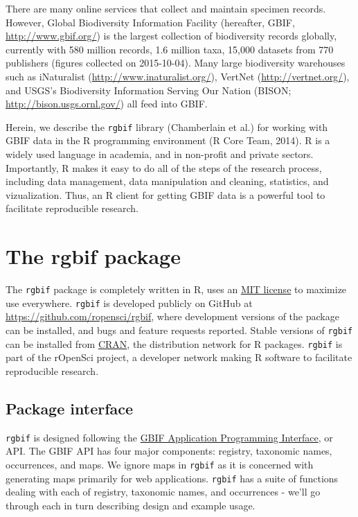 \documentclass[author-year, review, 11pt]{components/elsarticle} %
\begin{document}
There are many online services that collect and maintain specimen
records. However, Global Biodiversity Information Facility (hereafter,
GBIF, \url{http://www.gbif.org/}) is the largest collection of
biodiversity records globally, currently with 580 million records, 1.6
million taxa, 15,000 datasets from 770 publishers (figures collected on
2015-10-04). Many large biodiversity warehouses such as iNaturalist
(\url{http://www.inaturalist.org/}), VertNet
(\url{http://vertnet.org/}), and USGS's Biodiversity Information Serving
Our Nation (BISON; \url{http://bison.usgs.ornl.gov/}) all feed into
GBIF.

Herein, we describe the \texttt{rgbif} library (Chamberlain et al.) for
working with GBIF data in the R programming environment (R Core Team,
2014). R is a widely used language in academia, and in non-profit and
private sectors. Importantly, R makes it easy to do all of the steps of
the research process, including data management, data manipulation and
cleaning, statistics, and vizualization. Thus, an R client for getting
GBIF data is a powerful tool to facilitate reproducible research.

\section{The rgbif package}\label{the-rgbif-package}

The \texttt{rgbif} package is completely written in R, uses an
\href{http://choosealicense.com/licenses/mit/}{MIT license} to maximize
use everywhere. \texttt{rgbif} is developed publicly on GitHub at
\href{https://github.com/ropensci/rgbif}{\url{https://github.com/ropensci/rgbif}},
where development versions of the package can be installed, and bugs and
feature requests reported. Stable versions of \texttt{rgbif} can be
installed from
\href{https://cran.rstudio.com/web/packages/rgbif/}{CRAN}, the
distribution network for R packages. \texttt{rgbif} is part of the
rOpenSci project, a developer network making R software to facilitate
reproducible research.

\subsection{Package interface}\label{package-interface}

\texttt{rgbif} is designed following the
\href{http://www.gbif.org/developer/summary}{GBIF Application
Programming Interface}, or API. The GBIF API has four major components:
registry, taxonomic names, occurrences, and maps. We ignore maps in
\texttt{rgbif} as it is concerned with generating maps primarily for web
applications. \texttt{rgbif} has a suite of functions dealing with each
of registry, taxonomic names, and occurrences - we'll go through each in
turn describing design and example usage.
\end{document}
